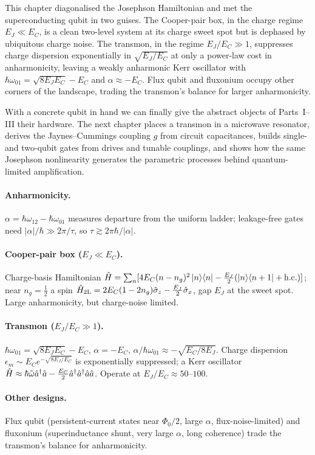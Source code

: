 This chapter diagonalised the Josephson Hamiltonian and met the
superconducting qubit in two guises. The Cooper-pair box, in the
charge regime $E_J\ll E_C$, is a clean two-level system at its charge
sweet spot but is dephased by ubiquitous charge noise. The transmon,
in the regime $E_J/E_C\gg1$, suppresses charge dispersion
exponentially in $\sqrt{E_J/E_C}$ at only a power-law cost in
anharmonicity, leaving a weakly anharmonic Kerr oscillator with
$\hbar\omega_{01}=\sqrt{8E_JE_C}-E_C$ and $\alpha\approx-E_C$. Flux
qubit and fluxonium occupy other corners of the landscape, trading the
transmon's balance for larger anharmonicity.

With a concrete qubit in hand we can finally give the abstract objects
of Parts~I--III their hardware. The next chapter places a transmon in a
microwave resonator, derives the Jaynes--Cummings coupling $g$ from
circuit capacitances, builds single- and two-qubit gates from drives
and tunable couplings, and shows how the same Josephson nonlinearity
generates the parametric processes behind quantum-limited
amplification.

\clearpage
\begin{chaptersummary}

\paragraph{Anharmonicity.}
$\alpha=\hbar\omega_{12}-\hbar\omega_{01}$ measures departure from the
uniform ladder; leakage-free gates need $|\alpha|/\hbar\gg2\pi/\tau$,
so $\tau\gtrsim2\pi\hbar/|\alpha|$.

\paragraph{Cooper-pair box ($E_J\ll E_C$).}
Charge-basis Hamiltonian
$\hat{H}=\sum_n[4E_C(n-n_g)^2\ket n\!\bra n-\tfrac{E_J}{2}(\ket n\!\bra{n+1}+\text{h.c.})]$;
near $n_g=\tfrac12$ a spin
$\hat{H}_{\rm 2L}=2E_C(1-2n_g)\hat\sigma_z-\tfrac{E_J}{2}\hat\sigma_x$,
gap $E_J$ at the sweet spot. Large anharmonicity, but charge-noise
limited.

\paragraph{Transmon ($E_J/E_C\gg1$).}
$\hbar\omega_{01}=\sqrt{8E_JE_C}-E_C$, $\alpha=-E_C$,
$\alpha/\hbar\omega_{01}\approx-\sqrt{E_C/8E_J}$. Charge dispersion
$\epsilon_m\sim E_Ce^{-\sqrt{8E_J/E_C}}$ is exponentially suppressed; a
Kerr oscillator
$\hat{H}\approx\hbar\tilde\omega\hat a^\dagger\hat a-\tfrac{E_C}{2}\hat a^\dagger\hat a^\dagger\hat a\hat a$.
Operate at $E_J/E_C\approx50$--$100$.

\paragraph{Other designs.}
Flux qubit (persistent-current states near $\Phi_0/2$, large $\alpha$,
flux-noise-limited) and fluxonium (superinductance shunt, very large
$\alpha$, long coherence) trade the transmon's balance for
anharmonicity.

\end{chaptersummary}


